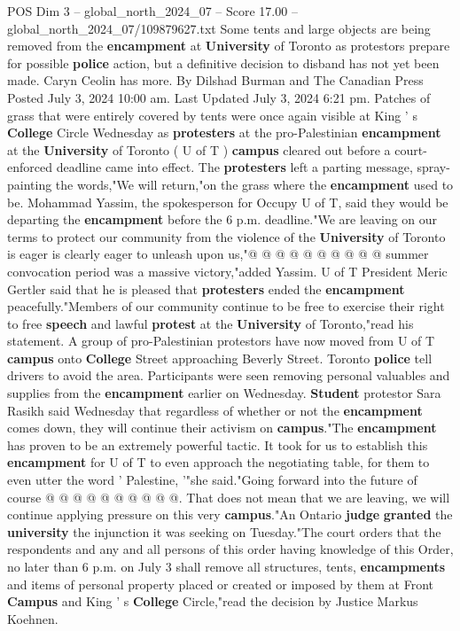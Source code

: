 \begin{textsample}{POS Dim 3 – global\_north\_2024\_07 – Score 17.00 – global\_north\_2024\_07/109879627.txt}  \label{ex:f3_pos_085}
Some tents and large objects are being removed from the \textbf{encampment} at \textbf{University} of Toronto as protestors prepare for possible \textbf{police} action, but a definitive decision to disband has not yet been made.
Caryn Ceolin has more.
By Dilshad Burman and The Canadian Press Posted July 3, 2024 10:00 am.
Last Updated July 3, 2024 6:21 pm.
Patches of grass that were entirely covered by tents were once again visible at King ' s \textbf{College} Circle Wednesday as \textbf{protesters} at the pro-Palestinian \textbf{encampment} at the \textbf{University} of Toronto ( U of T ) \textbf{campus} cleared out before a court-enforced deadline came into effect.
The \textbf{protesters} left a parting message, spray-painting the words,"We will return,"on the grass where the \textbf{encampment} used to be.
Mohammad Yassim, the spokesperson for Occupy U of T, said they would be departing the \textbf{encampment} before the 6 p.m. deadline."We are leaving on our terms to protect our community from the violence of the \textbf{University} of Toronto is eager is clearly eager to unleash upon us,"@ @ @ @ @ @ @ @ @ @ summer convocation period was a massive victory,"added Yassim.
U of T President Meric Gertler said that he is pleased that \textbf{protesters} ended the \textbf{encampment} peacefully."Members of our community continue to be free to exercise their right to free \textbf{speech} and lawful \textbf{protest} at the \textbf{University} of Toronto,"read his statement.
A group of pro-Palestinian protestors have now moved from U of T \textbf{campus} onto \textbf{College} Street approaching Beverly Street.
Toronto \textbf{police} tell drivers to avoid the area.
Participants were seen removing personal valuables and supplies from the \textbf{encampment} earlier on Wednesday. \textbf{Student} protestor Sara Rasikh said Wednesday that regardless of whether or not the \textbf{encampment} comes down, they will continue their activism on \textbf{campus}."The \textbf{encampment} has proven to be an extremely powerful tactic.
It took for us to establish this \textbf{encampment} for U of T to even approach the negotiating table, for them to even utter the word ' Palestine, '"she said."Going forward into the future of course @ @ @ @ @ @ @ @ @ @.
That does not mean that we are leaving, we will continue applying pressure on this very \textbf{campus}."An Ontario \textbf{judge} \textbf{granted} the \textbf{university} the injunction it was seeking on Tuesday."The court orders that the respondents and any and all persons of this order having knowledge of this Order, no later than 6 p.m. on July 3 shall remove all structures, tents, \textbf{encampments} and items of personal property placed or created or imposed by them at Front \textbf{Campus} and King ' s \textbf{College} Circle,"read the decision by Justice Markus Koehnen.

\end{textsample}
